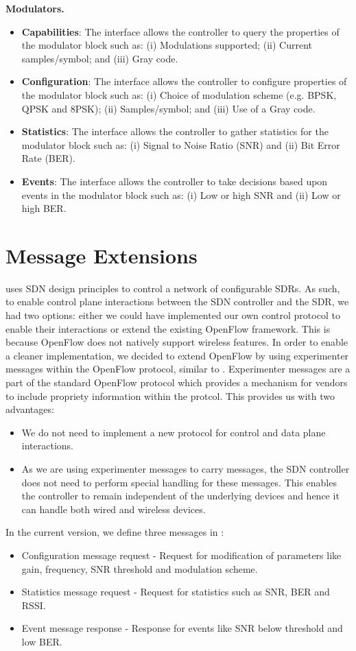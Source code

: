 \textbf{Modulators.}
\begin{itemize}
\item \textbf{Capabilities}: The interface allows the controller to query the properties of the modulator block such as:
    (i) Modulations supported;
    (ii) Current samples/symbol; and
    (iii) Gray code.
\item \textbf{Configuration}: The interface allows the controller to configure properties of the modulator block such as:
    (i) Choice of modulation scheme (e.g. BPSK, QPSK and 8PSK);
    (ii) Samples/symbol; and
    (iii) Use of a Gray code.
\item \textbf{Statistics}: The interface allows the controller to gather statistics for the modulator block such as:
    (i) Signal to Noise Ratio (SNR) and 
    (ii) Bit Error Rate (BER).
\item \textbf{Events}: The interface allows the controller to take decisions based upon events in the modulator block such as:
    (i) Low or high SNR and
    (ii) Low or high BER.
\end{itemize}

\section{\crossflow Message Extensions}
\label{sec:messages}
  		  
\crossflow uses SDN design principles to control a network of configurable SDRs. As such, to enable control plane interactions between the SDN controller and the SDR, we had two options: either we could have implemented our own control protocol to enable their interactions or extend the existing OpenFlow \cite{openflow} framework. This is because OpenFlow does not natively support wireless features. In order to enable a cleaner implementation, we decided to extend OpenFlow by using experimenter messages within the OpenFlow protocol, similar to \aetherflow. Experimenter messages are a part of the standard OpenFlow protocol which provides a mechanism for vendors to include propriety information within the protcol. This provides us with two advantages:
\begin{itemize}
\item We do not need to implement a new protocol for control and data plane interactions.
\item As we are using experimenter messages to carry \crossflow messages, the SDN controller does not need to perform special handling for these messages. This enables the controller to remain independent of the underlying devices and hence it can handle both wired and wireless devices.
\end{itemize}
In the current version, we define three messages in \crossflow:
\begin{itemize}
\item Configuration message request - Request for modification of parameters like gain, frequency, SNR threshold and modulation scheme.
\item Statistics message request - Request for statistics such as SNR, BER and RSSI.
\item Event message response - Response for events like SNR below threshold and low BER.
\end {itemize}
